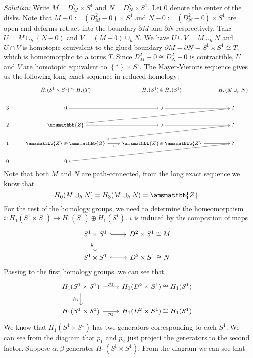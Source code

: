\documentclass[a4paper, 12pt]{article}
\newenvironment{solution}
    {\textit{Solution:}}
    {}
\renewcommand{\mathbb}{\amsmathbb}
\begin{document}
\begin{solution}
Write \(M=D^2_M\times S^1\) and \(N=D^2_N\times S^1\). Let \(0\) denote the center of the disks. Note that \(M-0:=(D^2_M-0)\times S^1\) and \(N-0:=(D^2_N-0)\times S^1\) are open and deforms retract into the boundary \(\partial M\) and \(\partial N\) resprectively. Take 
\(U=M\cup_h(N-0)\) and \(V=(M-0)\cup_h N\). We have \(U\cup V=M\cup_h N\) and \(U\cap V\) is homotopic equivalent to the glued boundary \(\partial M=\partial N=S^1\times S^1\cong T\), which is homeomorphic to a torus \(T\). Since \(D^2_M-0\cong D^2_N-0\) is contractible, \(U\) and \(V\) are homotopic equivalent to \(\left\{ * \right\}\times S^1\). 
The Mayer-Vietoris sequence gives us the following long exact sequence in reduced homology:
\[\begin{tikzcd}
	& {\tilde{H}_*(S^1\times S^1)\cong \tilde{H}_*(T)} & {\tilde{H}_*(S^1)\oplus \tilde{H}_*(S^1)} & {\tilde{H}_*(M\cup_h N)} \\
	3 & 0 & 0 & {?} \\
	2 & {\mathbb{Z}} & 0 & {?} \\
	1 & {\mathbb{Z}\oplus \mathbb{Z}} & {\mathbb{Z}\oplus\mathbb{Z}} & {?} \\
	0 & 0
	\arrow[from=2-2, to=2-3]
	\arrow[from=2-3, to=2-4]
	\arrow[from=2-4, to=3-2]
	\arrow[from=3-2, to=3-3]
	\arrow[from=3-3, to=3-4]
	\arrow[from=3-4, to=4-2]
	\arrow["i"', from=4-2, to=4-3]
	\arrow[from=4-3, to=4-4]
	\arrow[from=4-4, to=5-2]
\end{tikzcd}\]
Note that both \(M\) and \(N\) are path-connected, from the long exact sequence we know that 
\[H_0(M\cup_h N)=H_3(M\cup_h N)=\mathbb{Z}.\]
For the rest of the homology groups, we need to determine the homeomorphism \(i:H_1(S^1\times S^1)\rightarrow H_1(S^1)\oplus H_1(S^1)\). \(i\) is induced by the compostion of maps 
\[\begin{tikzcd}
	{S^1\times S^1} & {D^2\times S^1\cong M} \\
	{S^1\times S^1} & {D^2\times S^1\cong N}
	\arrow[hook, from=1-1, to=1-2]
	\arrow["h"', from=1-1, to=2-1]
	\arrow[hook, from=2-1, to=2-2]
\end{tikzcd}\]
Passing to the first homology groups, we can see that 
\[\begin{tikzcd}
	{H_1(S^1\times S^1)} & {H_1(D^2\times S^1)\cong H_1(S^1)} \\
	{H_1(S^1\times S^1)} & {H_1(D^2\times S^1)\cong H_1(S^1)}
	\arrow["{p_1}", from=1-1, to=1-2]
	\arrow["{h_*}"', from=1-1, to=2-1]
	\arrow["{p_2}"', from=2-1, to=2-2]
\end{tikzcd}\]
We know that \(H_1(S^1\times S^1)\) has two generators corresponding to each \(S^1\). We can see from the diagram that \(p_1\) and \(p_2\) just project the generators to the second factor. Suppose \(\alpha,\beta\) generates \(H_1(S^1\times S^1)\). From the diagram we can see that 

\end{solution}
\end{document}
